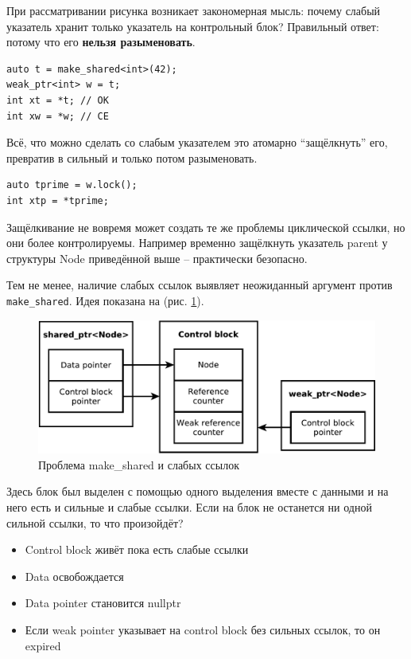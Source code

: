\documentclass[a4paper,12pt,oneside]{book}
\begin{document}
При рассматривании рисунка возникает закономерная мысль: почему слабый указатель хранит только указатель на контрольный блок? Правильный ответ: потому что его \textbf{нельзя разыменовать}.

\begin{lstlisting}
auto t = make_shared<int>(42);
weak_ptr<int> w = t;
int xt = *t; // OK
int xw = *w; // CE
\end{lstlisting}

Всё, что можно сделать со слабым указателем это атомарно ``защёлкнуть'' его, превратив в сильный и только потом разыменовать.

\begin{lstlisting}
auto tprime = w.lock();
int xtp = *tprime;
\end{lstlisting}

Защёлкивание не вовремя может создать те же проблемы циклической ссылки, но они более контролируемы. Например временно защёлкнуть указатель parent у структуры Node приведённой выше -- практически безопасно.

Тем не менее, наличие слабых ссылок выявляет неожиданный аргумент против \lstinline!make_shared!. Идея показана на (рис. \ref{fig:smartptrs-weak-inner}).

\begin{figure}[ht]
\centering
\includegraphics[width=1.0\textwidth]{illustrations/smartptrs-weak-inner-crop.pdf}
\caption{Проблема make\_shared и слабых ссылок}
\label{fig:smartptrs-weak-inner}
\end{figure}

Здесь блок был выделен с помощью одного выделения вместе с данными и на него есть и сильные и слабые ссылки. Если на блок не останется ни одной сильной ссылки, то что произойдёт?

\begin{itemize} 
\item Control block живёт пока есть слабые ссылки
\item Data освобождается
\item Data pointer становится nullptr
\item Если weak pointer указывает на control block без сильных ссылок, то он expired
\end{itemize} 
\end{document}

